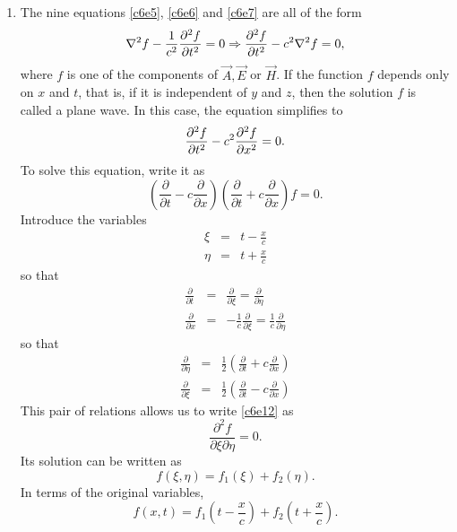 \begin{enumerate}
\item The nine equations \eqref{c6e5}, \eqref{c6e6} and \eqref{c6e7} are all of
the form
\[
\nabla^2 f - \frac{1}{c^2}\frac{\partial^2{f}}{\partial{t}^2} = 0 \Rightarrow 
\frac{\partial^2{f}}{\partial{t}^2} - c^2\nabla^2 f = 0,
\]
where $f$ is one of the components of $\vec{A}, \vec{E}$ or $\vec{H}$. If the 
function $f$ depends only on $x$ and $t$, that is, if it is independent of $y$ and
$z$, then the solution $f$ is called a plane wave. In this case, the equation 
simplifies to
\begin{equation}\label{c6e11}
\frac{\partial^2{f}}{\partial{t}^2} - c^2\frac{\partial^2{f}}{\partial{x}^2} = 0.
\end{equation}
To solve this equation, write it as
\begin{equation}\label{c6e12}
\left(\frac{\partial}{\partial t} - c\frac{\partial}{\partial x}\right)
\left(\frac{\partial}{\partial t} + c\frac{\partial}{\partial x}\right)f = 0.
\end{equation}
Introduce the variables
\begin{eqnarray}
\xi &=& t - \frac{x}{c} \label{c6e13} \\
\eta &=& t + \frac{x}{c} \label{c6e14}
\end{eqnarray}
so that
\begin{eqnarray}
\frac{\partial}{\partial t} &=& \frac{\partial}{\partial\xi} = 
 \frac{\partial}{\partial\eta} \label{c6e15} \\
\frac{\partial}{\partial x} &=& -\frac{1}{c}\frac{\partial}{\partial\xi} =
\frac{1}{c}\frac{\partial}{\partial\eta} \label{c6e16}
\end{eqnarray}
so that
\begin{eqnarray}
\frac{\partial}{\partial\eta} &=& \frac{1}{2}
	\left(\frac{\partial}{\partial t} + c\frac{\partial}{\partial x}\right) 
	\label{c6e17} \\
\frac{\partial}{\partial\xi} &=& \frac{1}{2}
	\left(\frac{\partial}{\partial t} - c\frac{\partial}{\partial x}\right) 
	\label{c6e18}
\end{eqnarray}
This pair of relations allows us to write \eqref{c6e12} as
\begin{equation}\label{c6e19}
\frac{\partial^2 f}{\partial\xi\partial\eta} = 0.
\end{equation}
Its solution can be written as
\begin{equation}\label{c6e20}
f(\xi, \eta) = f_1(\xi) + f_2(\eta).
\end{equation}
In terms of the original variables,
\begin{equation}\label{c6e21}
f(x, t) = f_1\left(t - \frac{x}{c}\right) + f_2\left(t + \frac{x}{c}\right).
\end{equation}


\end{enumerate}
